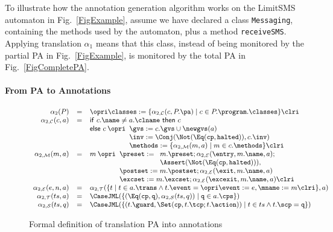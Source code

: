 To illustrate how the annotation generation algorithm
works on the LimitSMS automaton in Fig.~\ref{FigExample}, assume
we have declared a class \texttt{Messaging}, containing the
methods used by the automaton, plus a method \texttt{receiveSMS}.
Applying translation \(\alpha_1\) means that this class, instead of
being monitored by the partial PA in Fig.~\ref{FigExample}, is
monitored by the total PA in Fig.~\ref{FigCompletePA}.


\paragraph{From PA to Annotations}
\begin{figure}[t]
\[{\small
\begin{array}{rcl}
\alpha_2(P) & = &\opri \classes :=
\{\alpha_{2, \mathcal{C}}(c, P.\pa) \mid c \in P.\program.\classes\} \clri\\

\alpha_{2,\mathcal{C}}(c, a) & = &
\mathsf{if\ }c.\name \not = a.\clname \mathsf{\ then\ }c\\
&&
\mathsf{else\ }c \:\opri
 \begin{array}[t]{l}
 \gvs := c.\gvs \cup \newgvs(a)\\
 \inv := \Conj(\Not(\Eq(\texttt{cp}, \texttt{halted})), c.\inv)\\
 \methods := \{\alpha_{2,\mathcal{M}}(m, a) \mid m \in c.\methods\} \clri
\end{array}\\
\alpha_{2,\mathcal{M}}(m, a) & = & m \: \opri
  \begin{array}[t]{l}
  \preset := \begin{array}[t]{l}
             m.\preset; \alpha_{2,\mathcal{E}}(\entry, m.\name, a);\\
             \Assert(\Not(\Eq(\texttt{cp}, \texttt{halted}))),
             \end{array}\\
  \postset := m.\postset; \alpha_{2, \mathcal{E}}(\exit, m.\name, a)\\
  \excset := m.\excset; \alpha_{2, \mathcal{E}}(\excexit, m.\name, a)
  \clri
  \end{array}\\
\alpha_{2, \mathcal{E}}(e, n, a) & = &
  \alpha_{2, \mathcal{T}}(\{t \mid t \in a.\trans \wedge
                                   t.\event = \opri \event := e,
                                                    \mname := m \clri
                           \}, a)\\
\alpha_{2, \mathcal{T}}(ts, a) & = &
  \CaseJML(
    \{(\Eq(\texttt{cp}, \texttt{q}), \alpha_{2, \mathcal{S}}(ts, q))
      \mid \texttt{q} \in a.\cps
    \})\\
\alpha_{2, \mathcal{S}}(ts, q) & = &
       \CaseJML(\{(t.\guard, \Set(\texttt{cp}, t.\tcp; t.\action)) \mid
                  t \in ts \wedge t.\scp = \texttt{q}
               \})
\end{array}}
\]
\caption{Formal definition of translation PA into annotations}
\label{FigPAtoAnnot}
\end{figure}


